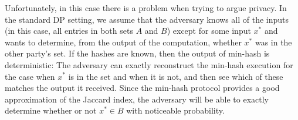 Unfortunately, in this case there is a problem when trying to argue privacy. In the standard DP setting, we assume that the adversary knows all of the inputs (in this case, all entries in both sets $A$ and $B$) except for some input $x^*$ and wants to determine, from the output of the computation, whether $x^*$ was in the other party's set.  If the hashes are known, then the output of min-hash is deterministic: The adversary can exactly reconstruct the min-hash execution for the case when $x^*$ is in the set and when it is not, and then see which of these matches the output it received. 
 Since the min-hash protocol provides a good approximation of the Jaccard index, the adversary will be able to 
 exactly determine whether or not $x^* \in B$ with noticeable probability.%


